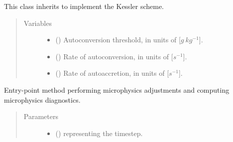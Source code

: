 \documentclass[letterpaper,10pt,english]{sphinxmanual}
\begin{document}
\begin{fulllineitems}
\label{\detokenize{api:parameterizations.adjustment_microphysics.AdjustmentMicrophysicsKessler}}
This class inherits {\hyperref[\detokenize{api:parameterizations.adjustment_microphysics.AdjustmentMicrophysics}]{}}
to implement the Kessler scheme.
\begin{quote}\begin{description}
\item[{Variables}] \leavevmode\begin{itemize}
\item {} 
 () \textendash{} Autoconversion threshold, in units of {[}\(g ~ kg^{-1}\){]}.

\item {} 
 () \textendash{} Rate of autoconversion, in units of {[}\(s^{-1}\){]}.

\item {} 
 () \textendash{} Rate of autoaccretion, in units of {[}\(s^{-1}\){]}.

\end{itemize}

\end{description}\end{quote}

\begin{fulllineitems}
\label{\detokenize{api:parameterizations.adjustment_microphysics.AdjustmentMicrophysicsKessler.__call__}}
Entry-point method performing microphysics adjustments and computing microphysics diagnostics.
\begin{quote}\begin{description}
\item[{Parameters}] \leavevmode\begin{itemize}
\item {} 
 () \textendash{}  representing the timestep.


\end{itemize}
\end{description}
\end{quote}
\end{fulllineitems}
\end{fulllineitems}
\end{document}
